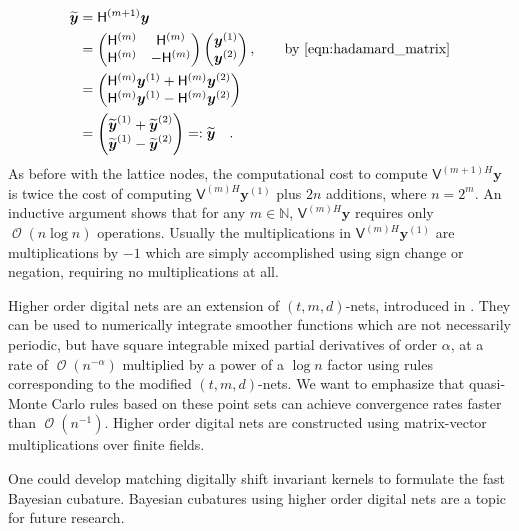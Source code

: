 \documentclass{iitthesis}          %
\DeclareMathOperator{\Order}{{\mathcal O}}
\newcommand{\bm}[1]{\boldsymbol{#1}}
\newcommand{\naturals}{\mathbb{N}}
\newcommand{\vy}{\bm{y}}
\newcommand{\mH}{\mathsf{H}}
\newcommand{\mV}{\mathsf{V}}
\begin{document}
\begin{align*}
\widetilde{\vy} &= \mH^{({m+1})} {\vy} \\
& = \begin{pmatrix}
\mH^{(m)} & \mH^{(m)} \\ \mH^{(m)} & - \mH^{(m)}
\end{pmatrix} 
\begin{pmatrix}
\vy^{(1)} \\ \vy^{(2)}
\end{pmatrix}, \qquad \text{by \eqref{eqn:hadamard_matrix}} \\
&= 
\begin{pmatrix}
\mH^{(m)} \vy^{(1)} + \mH^{(m)} \vy^{(2)} \\ 
\mH^{(m)} \vy^{(1)} - \mH^{(m)} \vy^{(2)}
\end{pmatrix}\\
&= 
\begin{pmatrix}
\widetilde{\vy}^{(1)} + \widetilde {\vy}^{(2)} \\ 
\widetilde {\vy}^{(1)} - \widetilde {\vy}^{(2)}
\end{pmatrix} =: \widetilde{\vy} \quad.
\end{align*}
As before with the lattice nodes, the computational cost to compute $\mV^{(m+1)H} \vy$ is 
twice the cost of computing $\mV^{(m)H} \vy^{(1)}$ plus $2n$ additions, where $n=2^m$. An inductive argument shows that for any $m \in \naturals$, $\mV^{(m)H}\vy$ requires only $\Order(n \log n)$ operations. Usually the multiplications in $\mV^{(m)H} \vy^{(1)}$ are multiplications by $-1$ which are simply accomplished using sign change or negation, requiring no multiplications at all.


Higher order digital nets are an extension of $(t,m,d)$-nets, introduced in \cite{Dic08a}. They can be used to numerically integrate smoother functions which are not necessarily periodic, but have square integrable mixed partial derivatives of order $\alpha$, at a rate of $\Order(n^{-\alpha})$ multiplied by a power of a $\log n$ factor using rules corresponding to the modified $(t,m, d)$-nets.
We want to emphasize that quasi-Monte Carlo rules based on these point sets can achieve convergence rates faster than $\Order(n^{-1})$. 
Higher order digital nets are constructed using matrix-vector multiplications over finite
fields. 

One could develop matching digitally shift invariant kernels to formulate the fast Bayesian cubature. Bayesian cubatures using higher order digital nets are a topic for future research.
\end{document}
